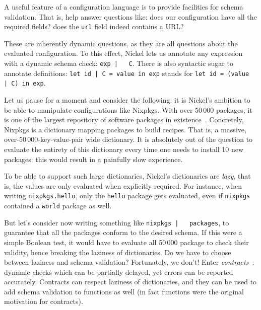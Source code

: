 \documentclass[sigplan,screen,10pt]{acmart}
\newcommand{\unsure}[2][1=]{}
\newcommand{\nickel}[1]{\lstinline[language=nickel]{#1}}
\begin{document}
A useful feature of a configuration language is to provide facilities
for schema validation. That is, help answer questions like: does our
configuration have all the required fields? does the \nickel{url} field indeed
contains a URL?

These are inherently dynamic questions, as they are all questions
about the evaluated configuration. To this effect, Nickel lets us
annotate any expression with a dynamic schema check: \nickel{exp |
  C}. There is also syntactic sugar to annotate definitions:
\nickel{let id | C = value in exp} stands for \nickel{let id = (value
  | C) in exp}.\unsure{This point used to be made, do we want to
  reinsert it? However, Nickel programs are of a special kind: they are usually
simple, terminating programs that run on fixed inputs. Correctness errors will
show up at evaluation anyway, or will not matter (dead code).}

Let us pause for a moment and consider the following: it is Nickel's
ambition to be able to manipulate configurations like Nixpkgs. With
over 50\,000 packages, it is one of the largest repository of software
packages in existence~\cite{repology}. Concretely, Nixpkgs is a
dictionary mapping packages to build recipes. That is, a massive,
over-50\,000-key-value-pair wide dictionary. It is absolutely out of the
question to evaluate the entirety of this dictionary every time one
needs to install 10 new packages: this would result in a painfully
slow experience.

To be able to support such large dictionaries, Nickel's dictionaries
are \emph{lazy}, that is, the values are only evaluated when
explicitly required. For instance, when writing
\hbox{\nickel{nixpkgs.hello},} only the \nickel{hello} package gets
evaluated, even if \nickel{nixpkgs} contained a
\nickel{world} package as well.

But let's consider now writing something like \nickel{nixpkgs |
  packages}, to guarantee that all the packages conform to the desired
schema. If this were a simple Boolean test, it would have to evaluate
all 50\,000 package to check their validity, hence breaking the
laziness of dictionaries. Do we have to choose between laziness and
schema validation? Fortunately, we don't! Enter
\emph{contracts}~\cite{FindlerFelleisenHOContracts}: dynamic checks
which can be partially delayed, yet errors can be reported
accurately. Contracts can respect laziness of dictionaries, and they
can be used to add schema validation to functions as well (in fact
functions were the original motivation for contracts).
\end{document}
